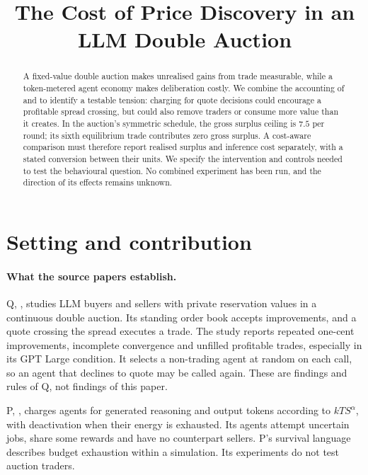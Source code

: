 \documentclass{article}
\title{The Cost of Price Discovery in an LLM Double Auction}
\begin{document}
\maketitle

\begin{abstract}
A fixed-value double auction makes unrealised gains from trade measurable, while a token-metered agent economy makes deliberation costly. We combine the accounting of \cite{struski2026competitive} and \cite{hansen2026energy} to identify a testable tension: charging for quote decisions could encourage a profitable spread crossing, but could also remove traders or consume more value than it creates. In the auction's symmetric schedule, the gross surplus ceiling is \(7.5\) per round; its sixth equilibrium trade contributes zero gross surplus. A cost-aware comparison must therefore report realised surplus and inference cost separately, with a stated conversion between their units. We specify the intervention and controls needed to test the behavioural question. No combined experiment has been run, and the direction of its effects remains unknown. %
\end{abstract}

\section{Setting and contribution}
\paragraph{What the source papers establish.}
Q, \cite{struski2026competitive}, studies LLM buyers and sellers with private reservation values in a continuous double auction. Its standing order book accepts improvements, and a quote crossing the spread executes a trade. The study reports repeated one-cent improvements, incomplete convergence and unfilled profitable trades, especially in its GPT Large condition. It selects a non-trading agent at random on each call, so an agent that declines to quote may be called again. These are findings and rules of Q, not findings of this paper. %

P, \cite{hansen2026energy}, charges agents for generated reasoning and output tokens according to \(kTS^{\alpha}\), with deactivation when their energy is exhausted. Its agents attempt uncertain jobs, share some rewards and have no counterpart sellers. P's survival language describes budget exhaustion within a simulation. Its experiments do not test auction traders. %
\end{document}
